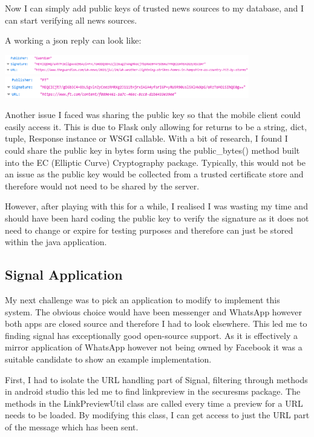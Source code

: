 \documentclass[a4paper, 11pt]{article}
\begin{document}
Now I can simply add public keys of trusted news sources to my database, and I can start verifying all news sources.

A working a json reply can look like:
\begin{center}
\includegraphics[width=0.8\textwidth]{image/json1.png}
\includegraphics[width=0.8\textwidth]{image/json2.png}
\end{center}

Another issue I faced was sharing the public key so that the mobile client could easily access it. This is due to Flask only allowing for returns to be a string, dict, tuple, Response instance or WSGI callable. With a bit of research, I found I could share the public key in bytes form using the public\_bytes() method built into the EC (Elliptic Curve) Cryptography package. Typically, this would not be an issue as the public key would be collected from a trusted certificate store and therefore would not need to be shared by the server.

However, after playing with this for a while, I realised I was wasting my time and should have been hard coding the public key to verify the signature as it does not need to change or expire for testing purposes and therefore can just be stored within the java application.

\subsection{Signal Application}
My next challenge was to pick an application to modify to implement this system. The obvious choice would have been messenger and WhatsApp however both apps are closed source and therefore I had to look elsewhere. This led me to finding signal \cite{Signal} has exceptionally good open-source support. As it is effectively a mirror application of WhatsApp however not being owned by Facebook it was a suitable candidate to show an example implementation.

First, I had to isolate the URL handling part of Signal, filtering through methods in android studio this led me to find linkpreview in the securesms package. The methods in the LinkPreviewUtil class are called every time a preview for a URL needs to be loaded. By modifying this class, I can get access to just the URL part of the message which has been sent.
\end{document}
